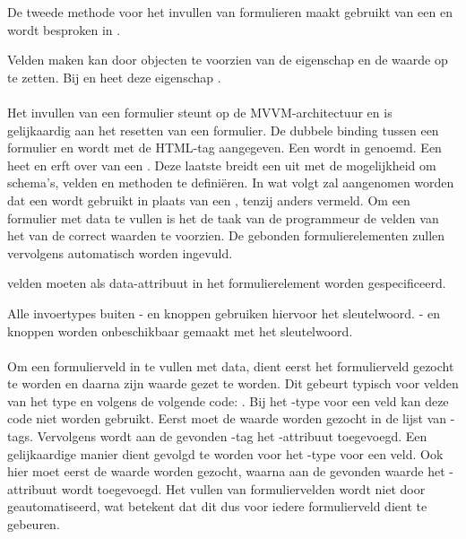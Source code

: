De tweede methode voor het invullen van formulieren maakt gebruikt van een  en wordt besproken in .

Velden  maken kan door objecten te voorzien van de  eigenschap en de waarde op  te zetten.
Bij  en  heet deze eigenschap .


\paragraph{\kendo}
Het invullen van een formulier steunt op de MVVM-architectuur en is gelijkaardig aan het resetten van een formulier.
De dubbele binding tussen een formulier en  wordt met de HTML-tag  aangegeven.
Een  wordt in \kendo{}  genoemd.
Een  heet  en erft over van een .
Deze laatste breidt een  uit met de mogelijkheid om schema's,  velden en methoden te definiëren.  
In wat volgt zal aangenomen worden dat een  wordt gebruikt in plaats van een ,  tenzij anders vermeld.
Om een formulier met data te vullen is het de taak van de programmeur de velden van het  van de correct waarden te voorzien.
De gebonden formulierelementen zullen vervolgens automatisch worden ingevuld.


 velden moeten als data-attribuut in het formulierelement worden gespecificeerd.

Alle invoertypes buiten - en knoppen gebruiken hiervoor het  sleutelwoord.
- en knoppen worden onbeschikbaar gemaakt met het  sleutelwoord.

\paragraph{\jqm}
Om een formulierveld in te vullen met data, dient eerst het formulierveld gezocht te worden en daarna zijn waarde gezet te worden.
Dit gebeurt typisch voor velden van het type  en  volgens de volgende code: .
Bij het -type voor een veld kan deze code niet worden gebruikt.
Eerst moet de waarde worden gezocht in de lijst van -tags.
Vervolgens wordt aan de gevonden -tag het -attribuut toegevoegd.
Een gelijkaardige manier dient gevolgd te worden voor het -type voor een veld.
Ook hier moet eerst de waarde worden gezocht, waarna aan de gevonden waarde het -attribuut wordt toegevoegd.
Het vullen van formuliervelden wordt niet door \jqm{} geautomatiseerd, wat betekent dat dit dus voor iedere formulierveld dient te gebeuren.

